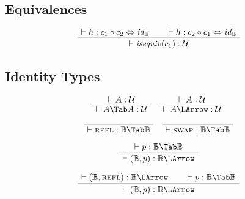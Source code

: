 \documentclass[format=acmlarge,review,natbib]{acmart}
\newcommand{\patht}[1]{#1 \Tab #1}
\newcommand{\fpatht}[1]{#1 \LArrow}
\newcommand{\compc}{\circ}
\newcommand{\reflp}{\textsc{refl}}
\newcommand{\swapp}{\textsc{swap}}
\newcommand{\isequiv}[1]{\mathit{isequiv}(#1)}
\newcommand{\idc}{\mathit{id}}
\newcommand{\isotwo}{\Leftrightarrow}
\newcommand{\boolt}{\mathbb{B}}
\newcommand{\univ}{\mathcal{U}}
\newcommand{\proves}{\vdash}
\newcommand{\jdg}[2]{\proves #1 : #2}
\begin{document}
\subsection{Equivalences}

\[\begin{array}{c}
  \AxiomC{$\jdg{h}{c_1\compc c_2 \isotwo \idc_{\boolt}}$}
  \AxiomC{$\jdg{h}{c_2\compc c_1 \isotwo \idc_{\boolt}}$}
  \BinaryInfC{$\jdg{\isequiv{c_1}}{\univ}$}
  \DisplayProof
\end{array}\]

\subsection{Identity Types}

\[\begin{array}{c}
  \AxiomC{$\jdg{A}{\univ}$}
  \UnaryInfC{$\jdg{\patht{A}}{\univ}$}
  \DisplayProof
\quad
  \AxiomC{$\jdg{A}{\univ}$}
  \UnaryInfC{$\jdg{\fpatht{A}}{\univ}$}
  \DisplayProof
\\
\\
  \AxiomC{}
  \UnaryInfC{$\jdg{\reflp}{\patht{\boolt}}$}
  \DisplayProof
\quad
  \AxiomC{}
  \UnaryInfC{$\jdg{\swapp}{\patht{\boolt}}$}
  \DisplayProof
\\
\\
  \AxiomC{$\jdg{p}{\patht{\boolt}}$}
  \UnaryInfC{$\jdg{(\boolt,p)}{\fpatht{\boolt}}$}
  \DisplayProof
\\
\\
  \AxiomC{$\jdg{(\boolt,\reflp)}{\fpatht{\boolt}}$}
  \AxiomC{$\jdg{p}{\patht{\boolt}}$}
  \BinaryInfC{$\jdg{(\boolt,p)}{\fpatht{\boolt}}$}
  \DisplayProof
\end{array}\]

\newpage
\end{document}
